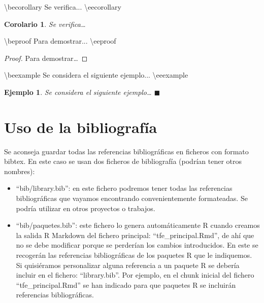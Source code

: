 \documentclass[12pt,a4paper,]{book}
\newenvironment{Shaded}{\begin{snugshade}}{\end{snugshade}}
\newcommand{\NormalTok}[1]{#1}
\newcommand{\beproof}{\begin{proof}} %
\newcommand{\eeproof}{\end{proof}} %
\newcounter{dummy}
\numberwithin{dummy}{section}
\theoremstyle{ocrenumbox}
\theoremstyle{blacknumex}
\newtheorem{exampleT}{Ejemplo}[chapter] %
\theoremstyle{blacknumbox}
\newtheorem{corollaryT}[dummy]{Corolario}  %
\theoremstyle{ocrenum}
\newenvironment{example}{\begin{exampleT}}{\hfill{\tiny\ensuremath{\blacksquare}}\end{exampleT}}
\newenvironment{corollary}{\begin{cBox}\begin{corollaryT}}{\end{corollaryT}\end{cBox}}
\theoremstyle{ocrenum}
\newcommand{\beexample}{\begin{example}}
\newcommand{\eeexample}{\end{example}}
\newcommand{\becorollary}{\begin{corollary}}
\newcommand{\eecorollary}{\end{corollary}}
\begin{document}
\begin{Shaded}
\begin{Highlighting}[]
\NormalTok{\textbackslash{}becorollary}
\NormalTok{Se verifica...}
\NormalTok{\textbackslash{}eecorollary}
\end{Highlighting}
\end{Shaded}

\becorollary

Se verifica\ldots{} \eecorollary

\begin{Shaded}
\begin{Highlighting}[]
\NormalTok{\textbackslash{}beproof}
\NormalTok{Para demostrar...}
\NormalTok{\textbackslash{}eeproof}
\end{Highlighting}
\end{Shaded}

\beproof

Para demostrar\ldots{} \eeproof

\begin{Shaded}
\begin{Highlighting}[]
\NormalTok{\textbackslash{}beexample}
\NormalTok{Se considera el siguiente ejemplo...}
\NormalTok{\textbackslash{}eeexample}
\end{Highlighting}
\end{Shaded}

\beexample

Se considera el siguiente ejemplo\ldots{} \eeexample

\hypertarget{uso-de-la-bibliografuxeda}{%
\section{Uso de la bibliografía}\label{uso-de-la-bibliografuxeda}}

Se aconseja guardar todas las referencias bibliográficas en ficheros con
formato bibtex. En este caso se usan dos ficheros de bibliografía
(podrían tener otros nombres):

\begin{itemize}
\item
  ``bib/library.bib'': en este fichero podremos tener todas las
  referencias bibliográficas que vayamos encontrando convenientemente
  formateadas. Se podría utilizar en otros proyectos o trabajos.
\item
  ``bib/paquetes.bib'': este fichero lo genera automáticamente R cuando
  creamos la salida R Markdown del fichero principal:
  ``tfe\_principal.Rmd'', de ahí que no se debe modificar porque se
  perderían los cambios introducidos. En este se recogerán las
  referencias bibliográficas de los paquetes R que le indiquemos. Si
  quisiéramos personalizar alguna referencia a un paquete R se debería
  incluir en el fichero: ``library.bib''. Por ejemplo, en el chunk
  inicial del fichero ``tfe\_principal.Rmd'' se han indicado para que
  paquetes R se incluirán referencias bibliográficas.
\end{itemize}
\end{document}
